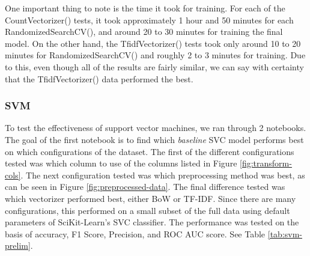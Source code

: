 \documentclass[stu,12pt,floatsintext]{apa7}
\begin{document}
One important thing to note is the time it took for training. For each of the CountVectorizer() tests, it took approximately 1 hour and 50 minutes for each RandomizedSearchCV(), and around 20 to 30 minutes for training the final model. On the other hand, the TfidfVectorizer() tests took only around 10 to 20 minutes for RandomizedSearchCV() and roughly 2 to 3 minutes for training. Due to this, even though all of the results are fairly similar, we can say with certainty that the TfidfVectorizer() data performed the best.

\subsubsection{SVM}
To test the effectiveness of support vector machines, we ran through 2 notebooks. The goal of the first notebook is to find which \textit{baseline} SVC model performs best on which configurations of the dataset. The first of the different configurations tested was which column to use of the columns listed in Figure \ref{fig:transform-cols}. The next configuration tested was which preprocessing method was best, as can be seen in Figure \ref{fig:preprocessed-data}. The final difference tested was which vectorizer performed best, either BoW or TF-IDF. Since there are many configurations, this performed on a small subset of the full data using default parameters of SciKit-Learn's SVC classifier. The performance was tested on the basis of accuracy, F1 Score, Precision, and ROC AUC score. See Table \ref{tab:svm-prelim}.
\end{document}

